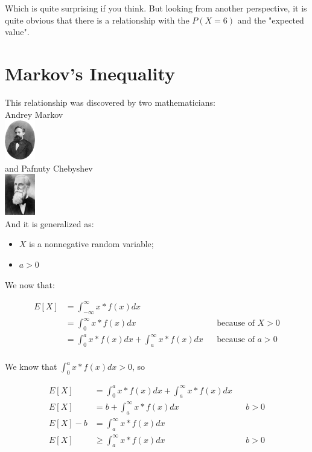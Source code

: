\documentclass[10pt,a4paper]{book}
\begin{document}
Which is quite surprising if you think. But looking from another perspective, it is quite obvious that there is a relationship with the $P(X=6)$ and the "expected value".
	
\section{Markov's Inequality}

This relationship was discovered by two mathematicians:\\	
Andrey Markov\\
\includegraphics[width=50px]{AAMarkov}\\

and Pafnuty Chebyshev\\
\includegraphics[width=50px]{Chebyshev}\\

And it is generalized as:
\begin{itemize}
	\item {$X$ is a nonnegative random variable;}
	\item {$a > 0$}
\end{itemize}	

We now that:

\begin{align*}
	E[X] &= \int_{-\infty}^{\infty}{x*f(x)dx}\\
	&= \int_{0}^{\infty}{x*f(x)dx} && \text{because of } X > 0\\
	&= \int_{0}^{a}{x*f(x)dx} + \int_{a}^{\infty}{x*f(x)dx} && \text{because of } a > 0\\	
\end{align*}

We know that $\int_{0}^{a}{x*f(x)dx} > 0$, so

\begin{align*}
	E[X] &= \int_{0}^{a}{x*f(x)dx} + \int_{a}^{\infty}{x*f(x)dx}\\
	E[X] &= b + \int_{a}^{\infty}{x*f(x)dx} && b > 0\\
	E[X] - b &= \int_{a}^{\infty}{x*f(x)dx}\\
	E[X] &\ge \int_{a}^{\infty}{x*f(x)dx} && b > 0\\
\end{align*}
\end{document}
